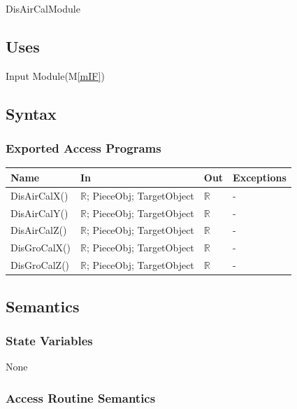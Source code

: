 \documentclass[12pt, titlepage]{article}
\newcommand{\mref}[1]{M\ref{#1}}
\begin{document}
DisAirCalModule

\subsection{Uses}

Input Module(\mref{mIF})
\subsection{Syntax}

\subsubsection{Exported Access Programs}

\begin{center}
	\begin{tabular}{p{2cm} p{4cm} p{4cm} p{2cm}}
		\hline
		\textbf{Name} & \textbf{In} & \textbf{Out} & \textbf{Exceptions} \\
		\hline
		DisAirCalX() & $\mathbb{R}$; PieceObj; TargetObject & $\mathbb{R}$ & - \\
		DisAirCalY() & $\mathbb{R}$; PieceObj; TargetObject & $\mathbb{R}$ & - \\
		DisAirCalZ() & $\mathbb{R}$; PieceObj; TargetObject & $\mathbb{R}$ & - \\
		DisGroCalX() & $\mathbb{R}$; PieceObj; TargetObject & $\mathbb{R}$ & - \\
		DisGroCalZ() & $\mathbb{R}$; PieceObj; TargetObject & $\mathbb{R}$ & - \\
		\hline
	\end{tabular}
\end{center}

\subsection{Semantics}

\subsubsection{State Variables}

None

\subsubsection{Access Routine Semantics}
\end{document}

